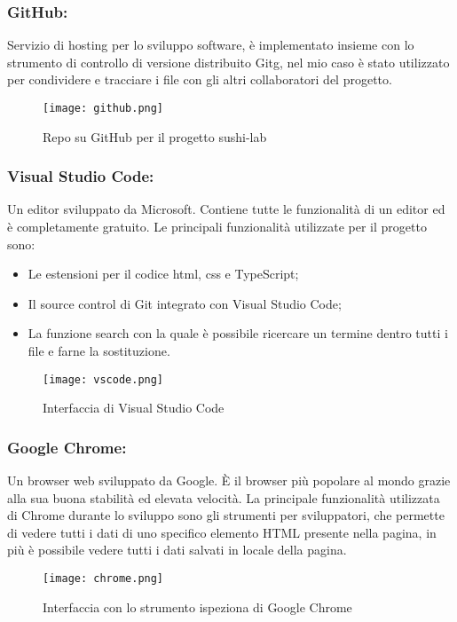 \subsubsection{GitHub:}
Servizio di hosting per lo sviluppo software, è implementato insieme con lo strumento di controllo di versione distribuito \gls{Gitg}, nel mio caso è stato utilizzato per condividere e tracciare i file con gli altri collaboratori del progetto.
\begin{figure}[H]
    \centering
    \texttt{[image: github.png]}
    \caption{Repo su GitHub per il progetto sushi-lab}
\end{figure}
\subsubsection{Visual Studio Code:}
Un editor sviluppato da Microsoft. Contiene tutte le funzionalità di un editor ed è completamente gratuito. Le principali funzionalità utilizzate per il progetto sono:
\begin{itemize}
    \item Le estensioni per il codice html, css e TypeScript;
    \item Il source control di Git integrato con Visual Studio Code;
    \item La funzione search con la quale è possibile ricercare un termine dentro tutti i file e farne la sostituzione.
\end{itemize}
\begin{figure}[H]
    \centering
    \texttt{[image: vscode.png]}
    \caption{Interfaccia di Visual Studio Code}
\end{figure}
\subsubsection{Google Chrome:}
Un browser web sviluppato da Google. È il browser più popolare al mondo grazie alla sua buona stabilità ed elevata velocità. La principale funzionalità utilizzata di Chrome durante lo sviluppo sono gli strumenti per sviluppatori, che permette di vedere tutti i dati di uno specifico elemento HTML presente nella pagina, in più è possibile vedere tutti i dati salvati in locale della pagina.
\begin{figure}[H]
    \centering
    \texttt{[image: chrome.png]}
    \caption{Interfaccia con lo strumento ispeziona di Google Chrome}
\end{figure}
    
